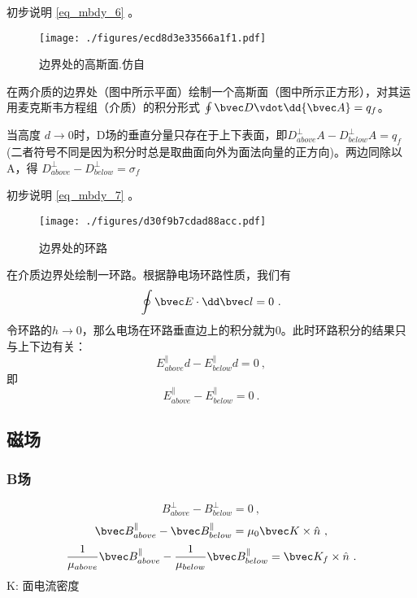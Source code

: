 \begin{example}{}
初步说明 \autoref{eq_mbdy_6} 。
\begin{figure}[ht]
\centering
\texttt{[image: ./figures/ecd8d3e33566a1f1.pdf]}
\caption{边界处的高斯面.仿自\cite{GriffE}} \label{fig_mbdy_1}
\end{figure}
在两介质的边界处（图中所示平面）绘制一个高斯面（图中所示正方形），对其运用麦克斯韦方程组（介质）的积分形式 $\oint \bvec D \vdot \dd{\bvec A} = q_f$。

当高度 $d\rightarrow0$时，D场的垂直分量只存在于上下表面，即$D^\perp_{above} A- D^\perp_{below} A= q_f$ (二者符号不同是因为积分时总是取曲面向外为面法向量的正方向)。两边同除以A，得 $D^\perp_{above} - D^\perp_{below} = \sigma_f$
\end{example}

\begin{example}{}
初步说明 \autoref{eq_mbdy_7} 。
\begin{figure}[ht]
\centering
\texttt{[image: ./figures/d30f9b7cdad88acc.pdf]}
\caption{边界处的环路} \label{fig_mbdy_3}
\end{figure}

在介质边界处绘制一环路。根据静电场环路性质，我们有
$$ \oint \bvec E \cdot \dd \bvec l = 0~.$$
令环路的$h\to0$，那么电场在环路垂直边上的积分就为$0$。此时环路积分的结果只与上下边有关：
$$ E_{above}^\parallel d-E_{below}^\parallel d = 0~,$$
即
$$ E_{above}^\parallel-E_{below}^\parallel = 0~.$$

\end{example}

\subsection{磁场}

\subsubsection{B场}
\begin{equation}
B^\perp_{above} - B^\perp_{below} = 0~,
\end{equation}
\begin{equation}
\bvec B^\parallel_{above} - \bvec B^\parallel_{below} = \mu_0\bvec K \times \hat n ~,
\end{equation}
\begin{equation}\label{eq_mbdy_2}
\frac{1}{\mu_{above}}\bvec B^\parallel_{above} - \frac{1}{\mu_{below}} \bvec B^\parallel_{below} = \bvec K_f \times \hat n ~.
\end{equation}
K: 面电流密度

